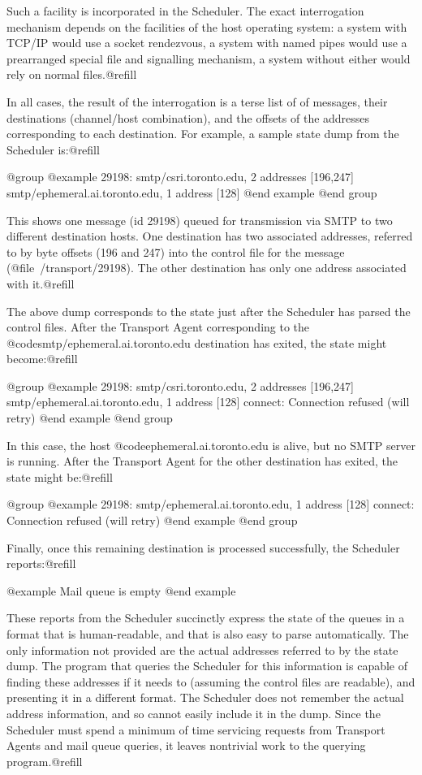 {{Such a facility is incorporated in the Scheduler.  The exact interrogation
mechanism depends on the facilities of the host operating system: a system
with TCP/IP would use a socket rendezvous, a system with named pipes would
use a prearranged special file and signalling mechanism, a system without
either would rely on normal files.@refill

In all cases, the result of the interrogation is a terse list of of messages,
their destinations (channel/host combination), and the offsets of
the addresses corresponding to each destination.  For example, a sample
state dump from the Scheduler is:@refill

@group
@example
29198:  smtp/csri.toronto.edu, 2 addresses [196,247]
        smtp/ephemeral.ai.toronto.edu, 1 address [128]
@end example
@end group

This shows one message (id 29198) queued for transmission via SMTP to two
different destination hosts.  One destination has two associated addresses,
referred to by byte offsets (196 and 247) into the control file for the
message (@file{~/transport/29198}).  The other destination has only one
address associated with it.@refill

The above dump corresponds to the state just after the Scheduler has parsed
the control files.  After the Transport Agent corresponding to the
@code{smtp/ephemeral.ai.toronto.edu} destination has exited, the state might
become:@refill

@group
@example
29198:  smtp/csri.toronto.edu, 2 addresses [196,247]
        smtp/ephemeral.ai.toronto.edu, 1 address [128]
                connect: Connection refused (will retry)
@end example
@end group

In this case, the host @code{ephemeral.ai.toronto.edu} is alive, but no
SMTP server is running.  After the Transport Agent for the other destination
has exited, the state might be:@refill

@group
@example
29198:  smtp/ephemeral.ai.toronto.edu, 1 address [128]
                connect: Connection refused (will retry)
@end example
@end group

Finally, once this remaining destination is processed successfully, the
Scheduler reports:@refill

@example
Mail queue is empty
@end example

These reports from the Scheduler succinctly express the state of the
queues in a format that is human-readable, and that is also easy to parse
automatically.  The only information not provided are the actual addresses
referred to by the state dump.  The program that queries the Scheduler for
this information is capable of finding these addresses if it needs
to (assuming the control files are readable), and presenting it in a different
format.  The Scheduler does not remember the actual address information, and
so cannot easily include it in the dump.  Since the Scheduler must spend a
minimum of time servicing requests from Transport Agents and mail queue
queries, it leaves nontrivial work to the querying program.@refill

}}
